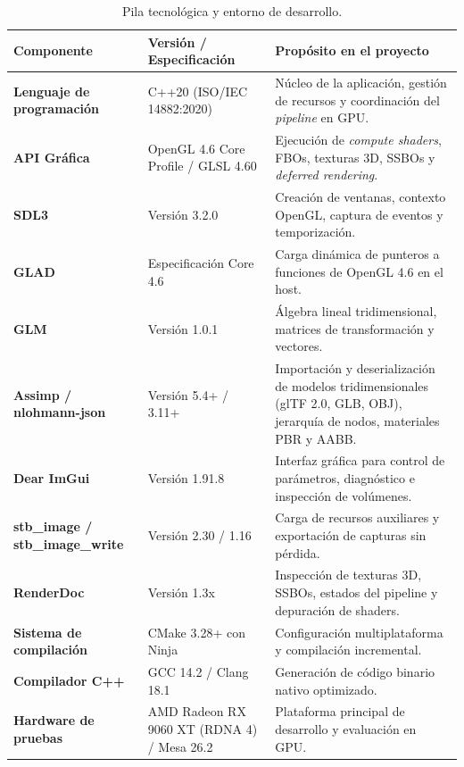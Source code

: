 \begin{table}[htbp]
  \centering
  \small
  \caption{Pila tecnológica y entorno de desarrollo.}
  \label{tab:pila}
  \begin{tabularx}{\textwidth}{|>{\bfseries}p{44mm}|>{\raggedright\arraybackslash}p{44mm}|X|}
    \hline
    \rowcolor{tablegray} Componente & Versión / Especificación & Propósito en el proyecto \\ \hline
    Lenguaje de programación & C++20 (ISO/IEC 14882:2020) & Núcleo de la aplicación, gestión de recursos y coordinación del \textit{pipeline} en GPU. \\ \hline
    API Gráfica & OpenGL 4.6 Core Profile / GLSL 4.60 & Ejecución de \textit{compute shaders}, FBOs, texturas 3D, SSBOs y \textit{deferred rendering}. \\ \hline
    SDL3 & Versión 3.2.0 & Creación de ventanas, contexto OpenGL, captura de eventos y temporización. \\ \hline
    GLAD & Especificación Core 4.6 & Carga dinámica de punteros a funciones de OpenGL 4.6 en el host. \\ \hline
    GLM & Versión 1.0.1 & Álgebra lineal tridimensional, matrices de transformación y vectores. \\ \hline
    Assimp / nlohmann-json & Versión 5.4+ / 3.11+ & Importación y deserialización de modelos tridimensionales (glTF 2.0, GLB, OBJ), jerarquía de nodos, materiales PBR y AABB. \\ \hline
    Dear ImGui & Versión 1.91.8 & Interfaz gráfica para control de parámetros, diagnóstico e inspección de volúmenes. \\ \hline
    stb\_image / stb\_image\_write & Versión 2.30 / 1.16 & Carga de recursos auxiliares y exportación de capturas sin pérdida. \\ \hline
    RenderDoc & Versión 1.3x & Inspección de texturas 3D, SSBOs, estados del pipeline y depuración de shaders. \\ \hline
    Sistema de compilación & CMake 3.28+ con Ninja & Configuración multiplataforma y compilación incremental. \\ \hline
    Compilador C++ & GCC 14.2 / Clang 18.1 & Generación de código binario nativo optimizado. \\ \hline
    Hardware de pruebas & AMD Radeon RX 9060 XT (RDNA 4) / Mesa 26.2 & Plataforma principal de desarrollo y evaluación en GPU. \\ \hline
  \end{tabularx}
\end{table}

